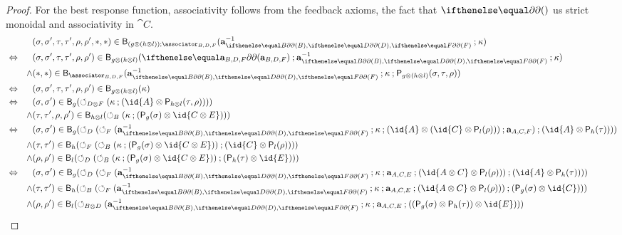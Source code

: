 \begin{proof}
For the best response function, associativity follows from the feedback axioms, the fact that \(\delay\) us strict monoidal and associativity in \(\cat{C}\).
\begin{align*} &&&(\sigma,\sigma',\tau,\tau',\rho,\rho',\ast,\ast) \in \best{(g \tensor (h \tensor l)) \dcomp \associator_{B,D,F}}(\aassociator^{-1}_{\delay[B],\delay[D],\delay[F]} \dcomp \kappa) \\
&\iff&&(\sigma,\sigma',\tau,\tau',\rho,\rho') \in \best{g \tensor (h \tensor l)}(\delay[\aassociator_{B,D,F}] \dcomp \aassociator^{-1}_{\delay[B],\delay[D],\delay[F]} \dcomp \kappa) \\
&&\land& (\ast,\ast) \in \best{\associator_{B,D,F}}(\aassociator^{-1}_{\delay[B],\delay[D],\delay[F]} \dcomp \kappa \dcomp \play{g \tensor (h \tensor l)}(\sigma,\tau,\rho))\\
&\iff&&(\sigma,\sigma',\tau,\tau',\rho,\rho') \in \best{g \tensor (h \tensor l)}(\kappa) \\
&\iff & & (\sigma,\sigma') \in \best{g}(\fbk[D \tensor F](\kappa \dcomp (\id{A} \tensor \play{h \tensor l}(\tau,\rho))))\\
&&\land&(\tau,\tau',\rho,\rho') \in \best{h \tensor l}(\fbk[B](\kappa \dcomp (\play{g}(\sigma) \tensor \id{C \tensor E})))\\
&\iff&& (\sigma,\sigma') \in \best{g}(\fbk[D](\fbk[F] (\aassociator^{-1}_{\delay[B],\delay[D],\delay[F]} \dcomp \kappa \dcomp (\id{A} \tensor (\id{C} \tensor \play{l}(\rho))) \dcomp \aassociator_{A,C,F}) \dcomp (\id{A} \tensor \play{h}(\tau))))\\
&&\land& (\tau,\tau') \in \best{h}(\fbk[F](\fbk[B] (\kappa \dcomp (\play{g}(\sigma) \tensor \id{C \tensor E}))\dcomp (\id{C} \tensor \play{l}(\rho)))) \\
&&\land& (\rho,\rho') \in \best{l}(\fbk[D](\fbk[B] (\kappa \dcomp (\play{g}(\sigma) \tensor \id{C \tensor E}))\dcomp (\play{h}(\tau) \tensor \id{E}))) \\
&\iff&& (\sigma,\sigma') \in \best{g}(\fbk[D](\fbk[F] (\aassociator^{-1}_{\delay[B],\delay[D],\delay[F]} \dcomp \kappa \dcomp \aassociator_{A,C,E} \dcomp (\id{A \tensor C} \tensor \play{l}(\rho))) \dcomp (\id{A} \tensor \play{h}(\tau))))\\
&&\land& (\tau,\tau') \in \best{h}(\fbk[B](\fbk[F] (\aassociator^{-1}_{\delay[B],\delay[D],\delay[F]} \dcomp \kappa \dcomp \aassociator_{A,C,E} \dcomp (\id{A \tensor C} \tensor \play{l}(\rho))) \dcomp (\play{g}(\sigma) \tensor \id{C}))) \\
&&\land& (\rho,\rho') \in \best{l}(\fbk[B \tensor D](\aassociator^{-1}_{\delay[B],\delay[D],\delay[F]} \dcomp \kappa \dcomp \aassociator_{A,C,E} \dcomp ((\play{g}(\sigma) \tensor \play{h}(\tau)) \tensor \id{E}))) \\

\end{align*}
\end{proof}

